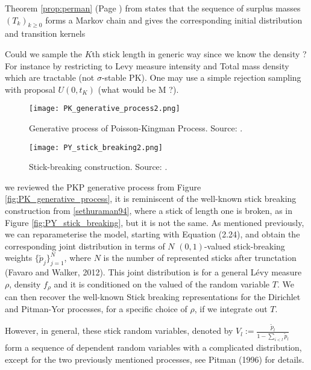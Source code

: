 Theorem \ref{prop:perman} (Page \pageref{prop:perman}) from \cite{Perman:1992ke} states that the sequence of surplus masses $(T_k)_{k \ge0}$ forms a Markov chain and gives the corresponding initial distribution and transition kernels

Could we sample the $K$th stick length in generic way since we know the density ? For instance by restricting to Levy measure intensity and Total mass density which are tractable (not $\sigma$-stable \gls{PK}). One may use a simple rejection sampling with proposal $U(0, t_K)$ (what would be M ?).

\begin{figure}[h]
  \centering
  \begin{minipage}[b]{0.48\textwidth}
    \texttt{[image: PK\_generative\_process2.png]}
    \caption{Generative process of Poisson-Kingman Process. Source: \cite{LomeliThesis}.}
  \end{minipage}
  \hfill
  \begin{minipage}[b]{0.48\textwidth}
    \texttt{[image: PY\_stick\_breaking2.png]}
    \caption{Stick-breaking construction. Source: \cite{LomeliThesis}.}
  \end{minipage}
\end{figure}

we reviewed the PKP generative process from Figure \ref{fig:PK_generative_process}, it is reminiscent of the well-known stick breaking construction from \ref{sethuraman94}, where a stick of length one is broken, as in Figure \ref{fig:PY_stick_breaking}, but it is not the same. As mentioned previously, we can reparameterise the model, starting with Equation (2.24), and obtain the corresponding joint distribution in terms of $N$ $(0,1)$-valued stick-breaking weights $\{\tilde{p}_j \}_{j=1}^N$, where $N$ is the number of represented sticks after trunctation (Favaro and Walker, 2012). This joint distribution is for a general Lévy measure $\rho$, density $f_\rho$ and it is conditioned on the valued of the random variable $T$. We can then recover the well-known Stick breaking representations for the Dirichlet and Pitman-Yor processes, for a specific choice of $\rho$, if we integrate out $T$.

However, in general, these stick random variables, denoted by $V_l := \frac{\tilde{p}_l}{1 - \sum_{i<l}{\tilde{p}_l}}$ form a sequence of dependent random variables with a complicated distribution, except for the two previously mentioned processes, see Pitman (1996) for details.

